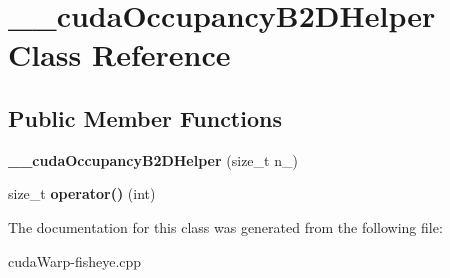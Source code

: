\hypertarget{class____cudaOccupancyB2DHelper}{}\section{\+\_\+\+\_\+cuda\+Occupancy\+B2\+D\+Helper Class Reference}
\label{class____cudaOccupancyB2DHelper}
\subsection*{Public Member Functions}
\begin{DoxyCompactItemize}
\item 
{\bfseries \+\_\+\+\_\+cuda\+Occupancy\+B2\+D\+Helper} (size\+\_\+t n\+\_\+)\hypertarget{class____cudaOccupancyB2DHelper_a4dec8725c8ad43028f417fa36bfd19ae}{}\label{class____cudaOccupancyB2DHelper_a4dec8725c8ad43028f417fa36bfd19ae}

\item 
size\+\_\+t {\bfseries operator()} (int)\hypertarget{class____cudaOccupancyB2DHelper_a9b4f0fbd383c46d3e2ff8db19cf417fe}{}\label{class____cudaOccupancyB2DHelper_a9b4f0fbd383c46d3e2ff8db19cf417fe}

\end{DoxyCompactItemize}


The documentation for this class was generated from the following file\+:\begin{DoxyCompactItemize}
\item 
cuda\+Warp-\/fisheye.\+cpp\end{DoxyCompactItemize}
